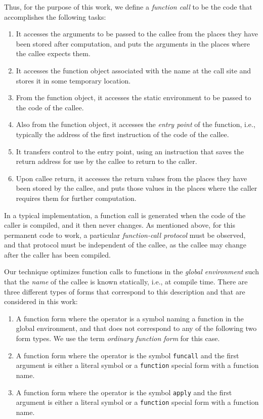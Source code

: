 Thus, for the purpose of this work, we define a \emph{function call}
to be the code that accomplishes the following tasks:

\begin{enumerate}
\item It accesses the arguments to be passed to the callee from the
  places they have been stored after computation, and puts the
  arguments in the places where the callee expects them.
\item It accesses the function object associated with the name at the
  call site and stores it in some temporary location.
\item From the function object, it accesses the static environment to
  be passed to the code of the callee.
\item Also from the function object, it accesses the \emph{entry
  point} of the function, i.e., typically the address of the first
  instruction of the code of the callee.
\item It transfers control to the entry point, using an instruction
  that saves the return address for use by the callee to return to the
  caller.
\item Upon callee return, it accesses the return values from the places
  they have been stored by the callee, and puts those values in the
  places where the caller requires them for further computation.
\end{enumerate}

In a typical implementation, a function call is generated when the
code of the caller is compiled, and it then never changes.  As
mentioned above, for this permanent code to work, a particular
\emph{function-call protocol} must be observed, and that protocol must
be independent of the callee, as the callee may change after the
caller has been compiled.

Our technique optimizes function calls to functions in the
\emph{global environment} such that the \emph{name} of the callee is
known statically, i.e., at compile time.  There are three different
types of forms that correspond to this description and that are
considered in this work:

\begin{enumerate}
\item A function form where the operator is a symbol naming a function
  in the global environment, and that does not correspond to any of
  the following two form types.  We use the term \emph{ordinary
    function form} for this case.
\item A function form where the operator is the symbol
  \texttt{funcall} and the first argument is either a literal symbol
  or a \texttt{function} special form with a function name.
\item A function form where the operator is the symbol
  \texttt{apply} and the first argument is either a literal symbol
  or a \texttt{function} special form with a function name.
\end{enumerate}

